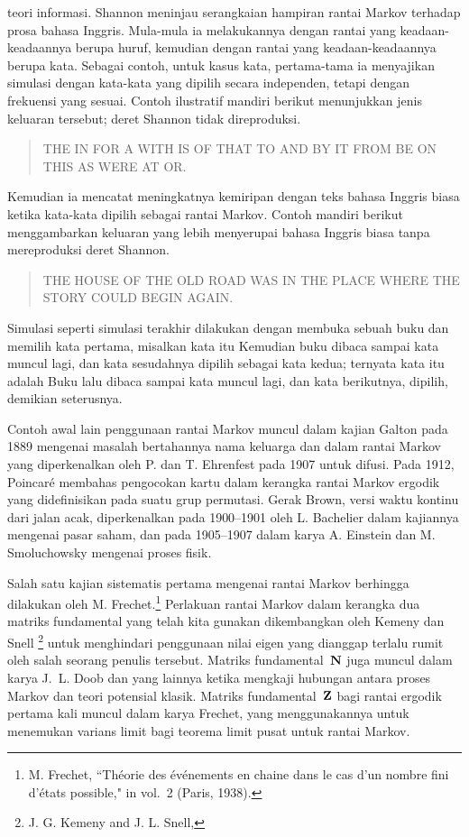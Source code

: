 teori informa\-si. Shannon meninjau serangkaian hampiran rantai Markov terhadap
prosa bahasa Inggris. Mula-mula ia melakukannya dengan rantai yang
keadaan-keadaannya berupa huruf, kemudian dengan rantai yang keadaan-keadaannya
berupa kata. Sebagai contoh, untuk kasus kata, pertama-tama ia menyajikan
simulasi dengan kata-kata yang dipilih secara independen, tetapi dengan frekuensi
yang sesuai. Contoh ilustratif mandiri berikut menunjukkan jenis keluaran tersebut;
deret Shannon tidak direproduksi.
\par
\begin{quote}
THE IN FOR A WITH IS OF THAT TO AND BY IT FROM BE ON THIS AS WERE AT OR.
\end{quote}
\par
Kemudian ia mencatat meningkatnya kemiripan dengan teks bahasa Inggris biasa
ketika kata-kata dipilih sebagai rantai Markov. Contoh mandiri berikut menggambarkan
keluaran yang lebih menyerupai bahasa Inggris biasa tanpa mereproduksi deret Shannon.

\begin{quote}
THE HOUSE OF THE OLD ROAD WAS IN THE PLACE WHERE THE STORY COULD BEGIN AGAIN.
\end{quote}
\par
Simulasi seperti simulasi terakhir dilakukan dengan membuka sebuah buku dan
memilih kata pertama, misalkan kata itu  Kemudian buku dibaca sampai
kata  muncul lagi, dan kata sesudahnya dipilih sebagai kata kedua;
ternyata kata itu adalah  Buku lalu dibaca sampai kata 
muncul lagi, dan kata berikutnya,  dipilih, demikian seterusnya.
\par
Contoh awal lain penggunaan rantai Markov muncul dalam kajian Galton pada 1889
mengenai masalah bertahannya nama keluarga dan dalam rantai Markov yang
diperkenalkan oleh P. dan T. Ehrenfest pada 1907 untuk difusi. Pada 1912,
Poincar\'{e} membahas pengocokan kartu dalam kerangka rantai Markov ergodik yang
didefinisikan pada suatu grup permutasi. Gerak Brown, versi waktu kontinu dari
jalan acak, diperkenalkan pada 1900--1901 oleh L. Bachelier dalam kajiannya
mengenai pasar saham, dan pada 1905--1907 dalam karya A. Einstein dan M.
Smoluchowsky mengenai proses fisik.
\par
Salah satu kajian sistematis pertama mengenai rantai Markov berhingga dilakukan
oleh M. Frechet.\footnote{M. Frechet, ``Th\'eorie des
\'ev\'enements en chaine dans
le cas d'un nombre fini d'\'etats possible," in  vol.~2 (Paris, 1938).} Perlakuan
rantai Markov dalam kerangka dua matriks fundamental yang telah kita gunakan
dikembangkan oleh Kemeny dan Snell
\footnote{J. G. Kemeny and J. L. Snell, } untuk menghindari penggunaan nilai eigen yang dianggap
terlalu rumit oleh salah seorang penulis tersebut. Matriks fundamental~${\mbox{\bf N}\/}$
juga muncul dalam karya J.~L. Doob dan yang lainnya ketika mengkaji hubungan
antara proses Markov dan teori potensial klasik. Matriks fundamental~${\mbox{\bf Z}\/}$
bagi rantai ergodik pertama kali muncul dalam karya Frechet, yang menggunakannya
untuk menemukan varians limit bagi teorema limit pusat untuk rantai Markov.

